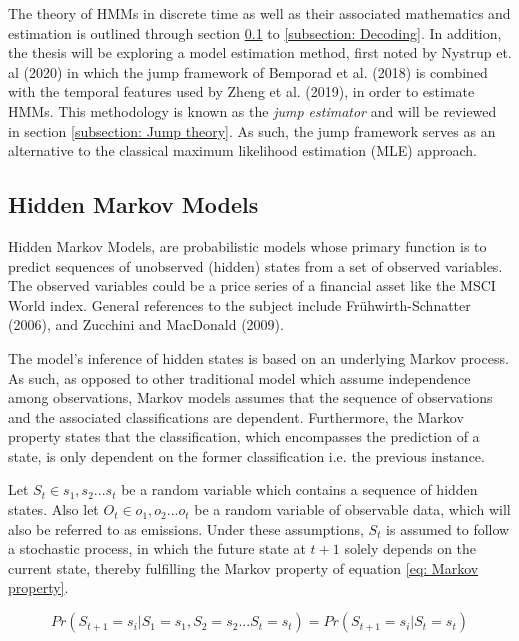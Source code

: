 The theory of HMMs in discrete time as well as their associated mathematics and estimation is outlined through section \ref{subsection: HMM} to \ref{subsection: Decoding}. In addition, the thesis will be exploring a model estimation method, first noted by Nystrup et. al (2020) in which the jump framework of Bemporad et al. (2018) is combined with the temporal features used by Zheng et al. (2019), in order to estimate HMMs. This methodology is known as the \textit{jump estimator} and will be reviewed in section \ref{subsection: Jump theory}. As such, the jump framework serves as an alternative to the classical maximum likelihood estimation (MLE) approach. 



\subsection{Hidden Markov Models}
\label{subsection: HMM}
Hidden Markov Models, are probabilistic models whose primary function is to predict sequences of unobserved (hidden) states from a set of observed variables. The observed variables could be a price series of a financial asset like the MSCI World index. General references to the subject include Frühwirth-Schnatter (2006), and Zucchini and MacDonald (2009). 

The model’s inference of hidden states is based on an underlying Markov process. As such, as opposed to other traditional model which assume independence among observations, Markov models assumes that the sequence of observations and the associated classifications are dependent. Furthermore, the Markov property states that the classification, which encompasses the prediction of a state, is only dependent on the former classification i.e. the previous instance. 

Let $S_t \in s_1, s_2...s_t$ be a random variable which contains a sequence of hidden states. Also let $O_t \in o_1, o_2...o_t$ be a random variable of observable data, which will also be referred to as emissions. Under these assumptions, $S_t$ is assumed to follow a stochastic process, in which the future state at $t + 1$ solely depends on the current state, thereby fulfilling the Markov property of equation \ref{eq: Markov property}.

\begin{equation}
    Pr(S_{t+1} = s_i|S_1 = s_1, S_2 = s_2...S_t = s_t) = Pr(S_{t+1}=s_i|S_t=s_t)
\label{eq: Markov property}
\end{equation}

